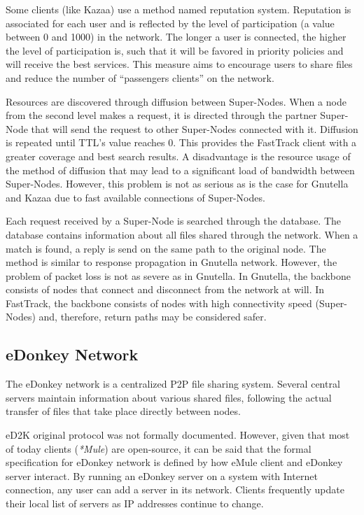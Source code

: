 Some clients (like Kazaa) use a method named reputation system. Reputation is
associated for each user and is reflected by the level of participation (a value
between 0 and 1000) in the network. The longer a user is connected, the higher
the level of participation is, such that it will be favored in priority
policies and will receive the best services. This measure aims to encourage
users to share files and reduce the number of ``passengers clients'' on the
network.

Resources are discovered through diffusion between Super-Nodes. When a node
from the second level makes a request, it is directed through the partner
Super-Node that will send the request to other Super-Nodes connected with it.
Diffusion is repeated until TTL's value reaches 0. This provides the FastTrack
client with a greater coverage and best search results. A disadvantage is the
resource usage of the method of diffusion that may lead to a significant load
of bandwidth between Super-Nodes. However, this problem is not as serious as
is the case for Gnutella and Kazaa due to fast available connections of
Super-Nodes.

Each request received by a Super-Node is searched through the database. The
database contains information about all files shared through the network. When
a match is found, a reply is send on the same path to the original node. The
method is similar to response propagation in Gnutella network. However, the
problem of packet loss is not as severe as in Gnutella. In Gnutella, the
backbone consists of nodes that connect and disconnect from the network at
will. In FastTrack, the backbone consists of nodes with high connectivity
speed (Super-Nodes) and, therefore, return paths may be considered safer.

\subsection{eDonkey Network}

The eDonkey network is a centralized P2P file sharing system. Several central
servers maintain information about various shared files, following the actual
transfer of files that take place directly between nodes.

eD2K original protocol was not formally documented. However, given that most
of today clients (\textit{*Mule}) are open-source, it can be said that the
formal specification for eDonkey network is defined by how eMule client and
eDonkey server interact. By running an eDonkey server on a system with
Internet connection, any user can add a server in its network. Clients
frequently update their local list of servers as IP addresses continue to
change.

